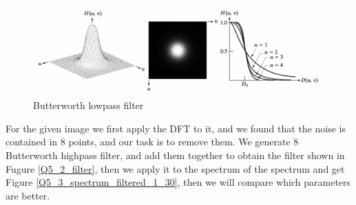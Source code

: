 \documentclass[
	12pt, %
]{style/fphw}
\begin{document}
\begin{figure}[H]
    \centering
    \includegraphics[width=0.8\linewidth]{chart/Butterworth.png}
    \caption{Butterworth lowpass filter}
    \label{Butterworth.png}
\end{figure}


For the given image we first apply the DFT to it, and we found that the noise is contained in 8 points, and our task is to remove them. We generate 8 Butterworth highpass filter, and add them together to obtain the filter shown in Fugure \ref{Q5_2_filter}, then we apply it to the spectrum of the spectrum and get Figure \ref{Q5_3_spectrum_filtered_1_30}, then we will compare which parameters are better.
\end{document}
